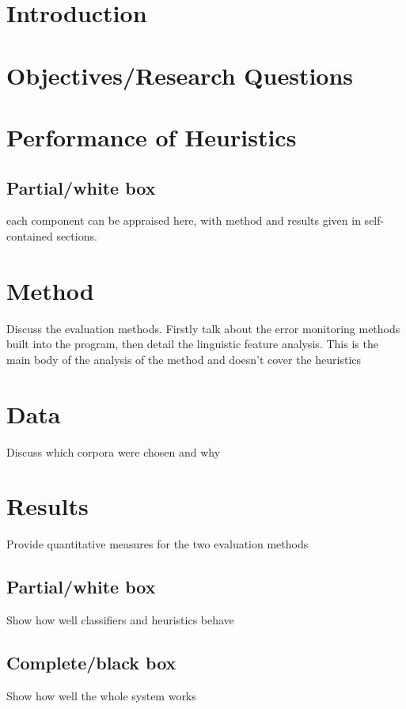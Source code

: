 \section*{Introduction}
\label{sec:evaluation:introduction}






\section{Objectives/Research Questions}
\label{sec:evaluation:rqs}




\section{Performance of Heuristics}
\label{sec:evaluation:}

\subsection{Partial/white box}
each component can be appraised here, with method and results given in self-contained sections.


\section{Method}
\label{sec:evaluation:}
Discuss the evaluation methods.  Firstly talk about the error monitoring methods built into the program, then detail the linguistic feature analysis.  This is the main body of the analysis of the method and doesn't cover the heuristics


\section{Data}
\label{sec:evaluation:method}
Discuss which corpora were chosen and why

\section{Results}
\label{sec:evaluation:}
Provide quantitative measures for the two evaluation methods
\subsection{Partial/white box}
Show how well classifiers and heuristics behave
\subsection{Complete/black box}
Show how well the whole system works


